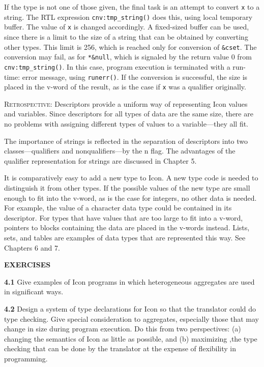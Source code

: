 If the type is not one of those given, the final task is an attempt to
convert \texttt{x} to a string. The RTL expression
\texttt{cnv:tmp\_string()} does this, using local temporary
buffer. The value of \texttt{x} is changed accordingly. A fixed-sized
buffer can be used, since there is a limit to the size of a string
that can be obtained by converting other types. This limit is 256,
which is reached only for conversion of \texttt{\&cset}. The
conversion may fail, as for \texttt{*\&null}, which is signaled by the
return value 0 from \texttt{cnv:tmp\_string()}. In this case, program
execution is terminated with a run-time: error message, using
\texttt{runerr()}. If the conversion is successful, the size is placed
in the v-word of the result, as is the case if \texttt{x} was a
qualifier originally.

\textsc{Retrospective}: Descriptors provide a uniform way of
representing Icon values and variables. Since descriptors for all
types of data are the same size, there are no problems with assigning
different types of values to a variable---they all fit.

The importance of strings is reflected in the separation of
descriptors into two classes---qualifiers and nonqualifiers---by the n
flag. The advantages of the qualifier representation for strings are
discussed in Chapter 5.

It is comparatively easy to add a new type to Icon. A new type code is
needed to distinguish it from other types. If the possible values of
the new type are small enough to fit into the v-word, as is the case
for integers, no other data is needed. For example, the value of a
character data type could be contained in its descriptor. For types
that have values that are too large to fit into a v-word, pointers to
blocks containing the data are placed in the v-words instead. Lists,
sets, and tables are examples of data types that are represented this
way. See Chapters 6 and 7.

\bigskip

\noindent\textbf{EXERCISES}

\noindent\textbf{4.1} Give examples of Icon programs in which
heterogeneous aggregates are used in significant ways.

\noindent\textbf{4.2} Design a system of type declarations for Icon so
that the translator could do type checking. Give special consideration
to aggregates, especially those that may change in size during program
execution. Do this from two perspectives: (a) changing the semantics
of Icon as little as possible, and (b) maximizing ,the type checking
that can be done by the translator at the expense of flexibility in
programming.

